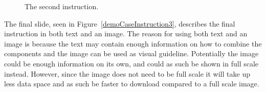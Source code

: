 	\begin{figure}[H]%
		\centering
		\qquad
		\qquad
		\caption{The second instruction.}
		\label{demoCaseInstruction2}
	\end{figure}

The final slide, seen in Figure~\ref{demoCaseInstruction3}, describes the final instruction in both text and an image. The reason for using both text and an image is because the text may contain enough information on how to combine the components and the image can be used as visual guideline. Potentially the image could be enough information on its own, and could as such be shown in full scale instead. However, since the image does not need to be full scale it will take up less data space and as such be faster to download compared to a full scale image.

